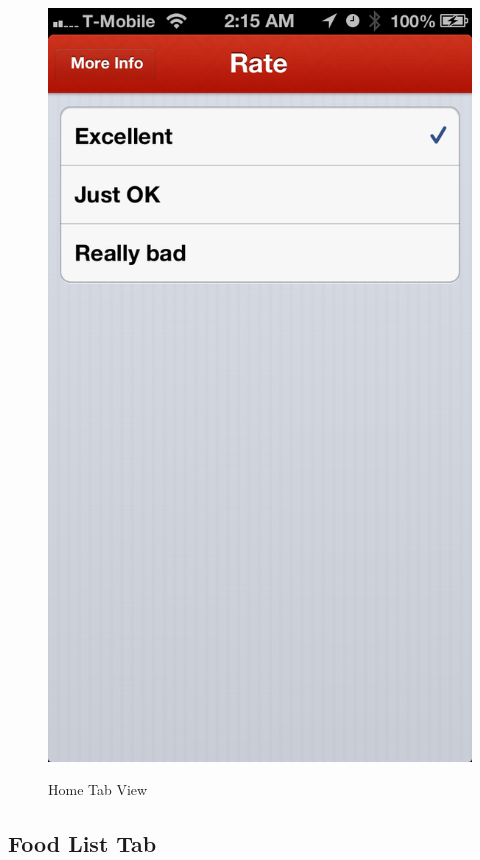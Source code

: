 \begin{figure}
{	\includegraphics[width=\figwidth, totalheight=\figheight, keepaspectratio]{./screenshots/home-rate.png}} \hfill
	\caption{Home Tab View}
	\label{fig:hometab}
\end{figure}




\subsection{Food List Tab} %
\label{sub:foodie_list_tab}

